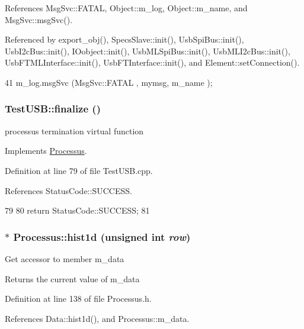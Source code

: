 References MsgSvc::FATAL, Object::m\_\-log, Object::m\_\-name, and MsgSvc::msgSvc().

Referenced by export\_\-obj(), SpecsSlave::init(), UsbSpiBus::init(), UsbI2cBus::init(), IOobject::init(), UsbMLSpiBus::init(), UsbMLI2cBus::init(), UsbFTMLInterface::init(), UsbFTInterface::init(), and Element::setConnection().


\begin{DoxyCode}
41 { m_log.msgSvc (MsgSvc::FATAL   , mymsg, m_name ); }
\end{DoxyCode}
\hypertarget{classTestUSB_a24bb22d7203746e6c3b5669aa71e72f3}{
\subsubsection[{finalize}]{ TestUSB::finalize ()}}
\label{classTestUSB_a24bb22d7203746e6c3b5669aa71e72f3}
processus termination virtual function 

Implements \hyperlink{classProcessus_aba93d691f031bdb18ae4b8afb1b2e856}{Processus}.

Definition at line 79 of file TestUSB.cpp.

References StatusCode::SUCCESS.


\begin{DoxyCode}
79                                {  
80   return StatusCode::SUCCESS;
81 }
\end{DoxyCode}
\hypertarget{classProcessus_a409227db936baff03c0462c1bcfe8069}{
\subsubsection[{hist1d}]{$\ast$ Processus::hist1d (unsigned int {\em row})}}
\label{classProcessus_a409227db936baff03c0462c1bcfe8069}
Get accessor to member m\_\-data \begin{DoxyReturn}{Returns}
the current value of m\_\-data 
\end{DoxyReturn}


Definition at line 138 of file Processus.h.

References Data::hist1d(), and Processus::m\_\-data.

